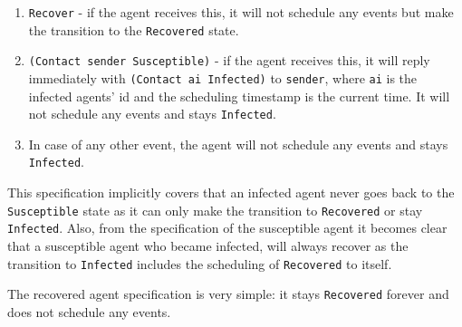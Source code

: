 \begin{enumerate}
	\item \texttt{Recover} - if the agent receives this, it will not schedule any events but make the transition to the \texttt{Recovered} state.
	
	\item \texttt{(Contact sender Susceptible)} - if the agent receives this, it will reply immediately with \texttt{(Contact ai Infected)} to \texttt{sender}, where \texttt{ai} is the infected agents' id and the scheduling timestamp is the current time. It will not schedule any events and stays \texttt{Infected}.
	
	\item In case of any other event, the agent will not schedule any events and stays \texttt{Infected}.
\end{enumerate}

This specification implicitly covers that an infected agent never goes back to the \texttt{Susceptible} state as it can only make the transition to \texttt{Recovered} or stay \texttt{Infected}. Also, from the specification of the susceptible agent it becomes clear that a susceptible agent who became infected, will always recover as the transition to \texttt{Infected} includes the scheduling of \texttt{Recovered} to itself. 

\medskip

The recovered agent specification is very simple: it stays \texttt{Recovered} forever and does not schedule any events.